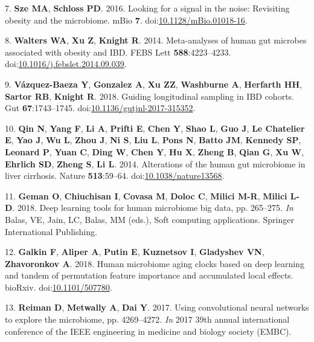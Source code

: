 \documentclass[11pt,]{article}
\begin{document}
\hypertarget{ref-sze_looking_2016}{}
7. \textbf{Sze MA}, \textbf{Schloss PD}. 2016. Looking for a signal in
the noise: Revisiting obesity and the microbiome. mBio \textbf{7}.
doi:\href{https://doi.org/10.1128/mBio.01018-16}{10.1128/mBio.01018-16}.

\hypertarget{ref-walters_meta-analyses_2014}{}
8. \textbf{Walters WA}, \textbf{Xu Z}, \textbf{Knight R}. 2014.
Meta-analyses of human gut microbes associated with obesity and IBD.
FEBS Lett \textbf{588}:4223--4233.
doi:\href{https://doi.org/10.1016/j.febslet.2014.09.039}{10.1016/j.febslet.2014.09.039}.

\hypertarget{ref-vazquez-baeza_guiding_2018}{}
9. \textbf{Vázquez-Baeza Y}, \textbf{Gonzalez A}, \textbf{Xu ZZ},
\textbf{Washburne A}, \textbf{Herfarth HH}, \textbf{Sartor RB},
\textbf{Knight R}. 2018. Guiding longitudinal sampling in IBD cohorts.
Gut \textbf{67}:1743--1745.
doi:\href{https://doi.org/10.1136/gutjnl-2017-315352}{10.1136/gutjnl-2017-315352}.

\hypertarget{ref-qin_alterations_2014}{}
10. \textbf{Qin N}, \textbf{Yang F}, \textbf{Li A}, \textbf{Prifti E},
\textbf{Chen Y}, \textbf{Shao L}, \textbf{Guo J}, \textbf{Le Chatelier
E}, \textbf{Yao J}, \textbf{Wu L}, \textbf{Zhou J}, \textbf{Ni S},
\textbf{Liu L}, \textbf{Pons N}, \textbf{Batto JM}, \textbf{Kennedy SP},
\textbf{Leonard P}, \textbf{Yuan C}, \textbf{Ding W}, \textbf{Chen Y},
\textbf{Hu X}, \textbf{Zheng B}, \textbf{Qian G}, \textbf{Xu W},
\textbf{Ehrlich SD}, \textbf{Zheng S}, \textbf{Li L}. 2014. Alterations
of the human gut microbiome in liver cirrhosis. Nature
\textbf{513}:59--64.
doi:\href{https://doi.org/10.1038/nature13568}{10.1038/nature13568}.

\hypertarget{ref-geman_deep_2018}{}
11. \textbf{Geman O}, \textbf{Chiuchisan I}, \textbf{Covasa M},
\textbf{Doloc C}, \textbf{Milici M-R}, \textbf{Milici L-D}. 2018. Deep
learning tools for human microbiome big data, pp. 265--275. \emph{In}
Balas, VE, Jain, LC, Balas, MM (eds.), Soft computing applications.
Springer International Publishing.

\hypertarget{ref-galkin_human_2018}{}
12. \textbf{Galkin F}, \textbf{Aliper A}, \textbf{Putin E},
\textbf{Kuznetsov I}, \textbf{Gladyshev VN}, \textbf{Zhavoronkov A}.
2018. Human microbiome aging clocks based on deep learning and tandem of
permutation feature importance and accumulated local effects. bioRxiv.
doi:\href{https://doi.org/10.1101/507780}{10.1101/507780}.

\hypertarget{ref-reiman_using_2017}{}
13. \textbf{Reiman D}, \textbf{Metwally A}, \textbf{Dai Y}. 2017. Using
convolutional neural networks to explore the microbiome, pp. 4269--4272.
\emph{In} 2017 39th annual international conference of the IEEE
engineering in medicine and biology society (EMBC).
\end{document}
